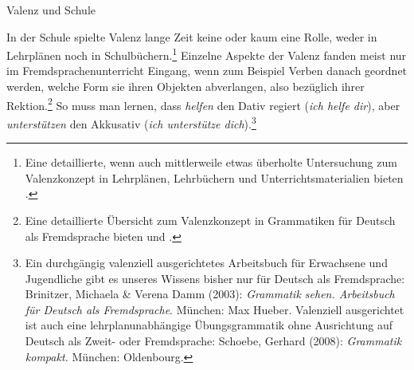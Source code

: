 \begin{Exkurs}{Valenz und Schule}
\label{ExkursValenzSchule}

In der Schule spielte Valenz lange Zeit keine oder kaum eine Rolle, weder in Lehrplänen noch in Schulbüchern.\footnote{Eine detaillierte, wenn auch mittlerweile etwas überholte Untersuchung zum Valenzkonzept in Lehrplänen, Lehrbüchern und Unterrichtsmaterialien bieten \citet{Kobler_Trill2006}.} Einzelne Aspekte der Valenz fanden meist nur im Fremdsprachenunterricht Eingang, wenn zum Beispiel Verben danach geordnet werden, welche Form sie ihren Objekten abverlangen, also bezüglich ihrer Rektion.\footnote{Eine detaillierte Übersicht zum Valenzkonzept in Grammatiken für Deutsch als Fremdsprache bieten \citet{Thurmair2006} und \citet{Fobbe2010Valenz_Daf}.} So muss man \zB lernen, dass \textit{helfen} den Dativ regiert (\textit{ich helfe dir}), aber \textit{unterstützen} den Akkusativ (\textit{ich unterstütze dich}).\footnote{Ein durchgängig valenziell ausgerichtetes Arbeitsbuch für Erwachsene und Jugendliche gibt es unseres Wissens bisher nur für Deutsch als Fremdsprache: Brinitzer, Michaela \& Verena Damm (2003): \textit{Grammatik sehen. Arbeitsbuch für Deutsch als Fremdsprache}. München: Max Hueber. Valenziell ausgerichtet ist auch eine lehrplanunabhängige Übungsgrammatik ohne Ausrichtung auf Deutsch als Zweit- oder Fremdsprache: Schoebe, Gerhard (2008): \textit{Grammatik kompakt.} München: Oldenbourg.}


\end{Exkurs}
